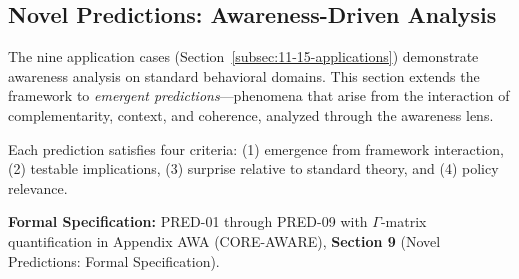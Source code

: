 \subsection{Novel Predictions: Awareness-Driven Analysis}
\label{subsec:11-16-novel-predictions}

The nine application cases (Section~\ref{subsec:11-15-applications}) demonstrate
awareness analysis on standard behavioral domains. This section extends the
framework to \emph{emergent predictions}---phenomena that arise from the
interaction of complementarity, context, and coherence, analyzed through
the awareness lens.

Each prediction satisfies four criteria: (1) emergence from framework
interaction, (2) testable implications, (3) surprise relative to standard
theory, and (4) policy relevance.



















\begin{cross-reference}
\textbf{Formal Specification:} PRED-01 through PRED-09 with $\Gamma$-matrix
quantification in Appendix AWA (CORE-AWARE), \textbf{Section 9}
(Novel Predictions: Formal Specification).
\end{cross-reference}

